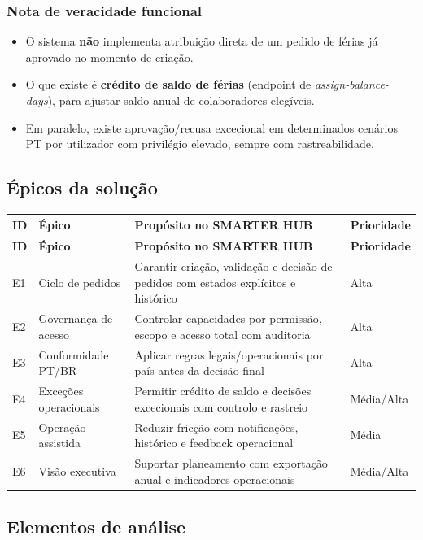 \documentclass[11pt,a4paper]{article}
\begin{document}
\subsubsection{Nota de veracidade funcional}
\begin{itemize}
  \item O sistema \textbf{não} implementa atribuição direta de um pedido de férias já aprovado no momento de criação.
  \item O que existe é \textbf{crédito de saldo de férias} (endpoint de \textit{assign-balance-days}), para ajustar saldo anual de colaboradores elegíveis.
  \item Em paralelo, existe aprovação/recusa excecional em determinados cenários PT por utilizador com privilégio elevado, sempre com rastreabilidade.
\end{itemize}

\subsection{Épicos da solução}
\begin{longtable}{p{1.2cm} p{4.0cm} p{7.0cm} p{2.2cm}}
\toprule
\textbf{ID} & \textbf{Épico} & \textbf{Propósito no SMARTER HUB} & \textbf{Prioridade} \\
\midrule
\endfirsthead
\toprule
\textbf{ID} & \textbf{Épico} & \textbf{Propósito no SMARTER HUB} & \textbf{Prioridade} \\
\midrule
\endhead
E1 & Ciclo de pedidos & Garantir criação, validação e decisão de pedidos com estados explícitos e histórico & Alta \\
E2 & Governança de acesso & Controlar capacidades por permissão, escopo e acesso total com auditoria & Alta \\
E3 & Conformidade PT/BR & Aplicar regras legais/operacionais por país antes da decisão final & Alta \\
E4 & Exceções operacionais & Permitir crédito de saldo e decisões excecionais com controlo e rastreio & Média/Alta \\
E5 & Operação assistida & Reduzir fricção com notificações, histórico e feedback operacional & Média \\
E6 & Visão executiva & Suportar planeamento com exportação anual e indicadores operacionais & Média/Alta \\
\bottomrule
\end{longtable}

\subsection{Elementos de análise}
\end{document}
